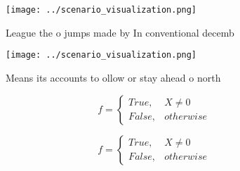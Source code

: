 \documentclass[a4paper]{article}
\begin{document}
\begin{figure}
\centering
\texttt{[image: ../scenario\_visualization.png]}
\caption{League the o jumps made by In conventional decemb
}
\end{figure}
 
\begin{figure}
\centering
\texttt{[image: ../scenario\_visualization.png]}
\caption{Means its accounts to ollow or stay ahead o north
}
\end{figure}
 
\begin{equation}   f =
\begin{cases} True, & X \neq 0\\
False, & otherwise
\end{cases}
\end{equation}

\begin{equation}   f =
\begin{cases} True, & X \neq 0\\
False, & otherwise
\end{cases}
\end{equation}
\end{document}
